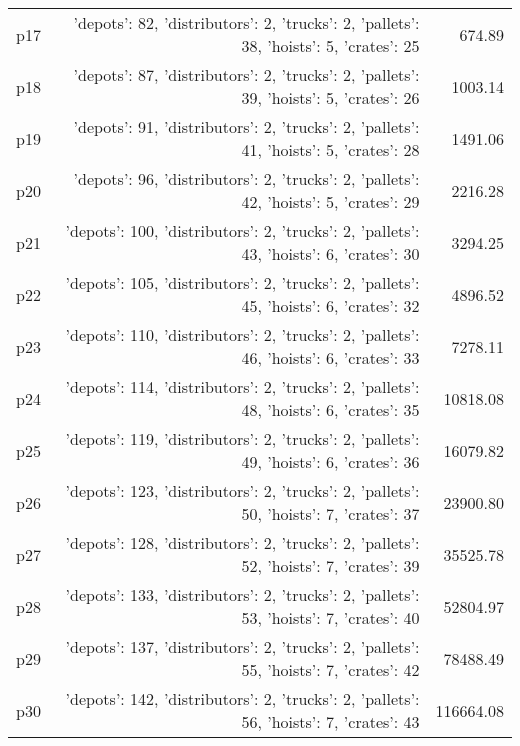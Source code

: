 \documentclass{article}
\begin{document}
\begin{center}
\begin{tabular}{@{}l|r|r@{}}
  p17&{'depots': 82, 'distributors': 2, 'trucks': 2, 'pallets': 38, 'hoists': 5, 'crates': 25}&674.89\\
  p18&{'depots': 87, 'distributors': 2, 'trucks': 2, 'pallets': 39, 'hoists': 5, 'crates': 26}&1003.14\\
  p19&{'depots': 91, 'distributors': 2, 'trucks': 2, 'pallets': 41, 'hoists': 5, 'crates': 28}&1491.06\\
  p20&{'depots': 96, 'distributors': 2, 'trucks': 2, 'pallets': 42, 'hoists': 5, 'crates': 29}&2216.28\\
  p21&{'depots': 100, 'distributors': 2, 'trucks': 2, 'pallets': 43, 'hoists': 6, 'crates': 30}&3294.25\\
  p22&{'depots': 105, 'distributors': 2, 'trucks': 2, 'pallets': 45, 'hoists': 6, 'crates': 32}&4896.52\\
  p23&{'depots': 110, 'distributors': 2, 'trucks': 2, 'pallets': 46, 'hoists': 6, 'crates': 33}&7278.11\\
  p24&{'depots': 114, 'distributors': 2, 'trucks': 2, 'pallets': 48, 'hoists': 6, 'crates': 35}&10818.08\\
  p25&{'depots': 119, 'distributors': 2, 'trucks': 2, 'pallets': 49, 'hoists': 6, 'crates': 36}&16079.82\\
  p26&{'depots': 123, 'distributors': 2, 'trucks': 2, 'pallets': 50, 'hoists': 7, 'crates': 37}&23900.80\\
  p27&{'depots': 128, 'distributors': 2, 'trucks': 2, 'pallets': 52, 'hoists': 7, 'crates': 39}&35525.78\\
  p28&{'depots': 133, 'distributors': 2, 'trucks': 2, 'pallets': 53, 'hoists': 7, 'crates': 40}&52804.97\\
  p29&{'depots': 137, 'distributors': 2, 'trucks': 2, 'pallets': 55, 'hoists': 7, 'crates': 42}&78488.49\\
  p30&{'depots': 142, 'distributors': 2, 'trucks': 2, 'pallets': 56, 'hoists': 7, 'crates': 43}&116664.08
                            \end{tabular}
                            \end{center}
                    
\end{document}
